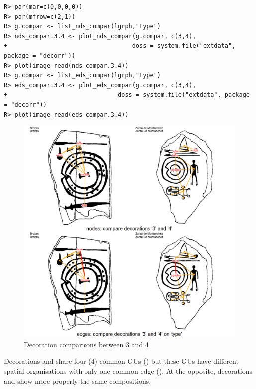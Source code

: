 \documentclass[article]{jss}\usepackage{knitr}
\begin{document}
\begin{kframe}
\begin{verbatim}
R> par(mar=c(0,0,0,0))
R> par(mfrow=c(2,1))
R> g.compar <- list_nds_compar(lgrph,"type")
R> nds_compar.3.4 <- plot_nds_compar(g.compar, c(3,4),
+                                   doss = system.file("extdata", package = "decorr"))
R> plot(image_read(nds_compar.3.4))
R> g.compar <- list_eds_compar(lgrph,"type")
R> eds_compar.3.4 <- plot_eds_compar(g.compar, c(3,4),
+                               doss = system.file("extdata", package = "decorr"))
R> plot(image_read(eds_compar.3.4))
\end{verbatim}
\end{kframe}\begin{figure}[H]

{\centering \includegraphics[width=\maxwidth]{figure/unnamed-chunk-17-1} 

}

\caption{\label{fig:figs}Decoration comparisons between 3 and 4}\label{fig:unnamed-chunk-17}
\end{figure}



Decorations  and  share four (4) common GUs () but  these GUs have different spatial organisations with only one common edge (). At the opposite, decorations  and  show more properly the same compositions.
\end{document}
